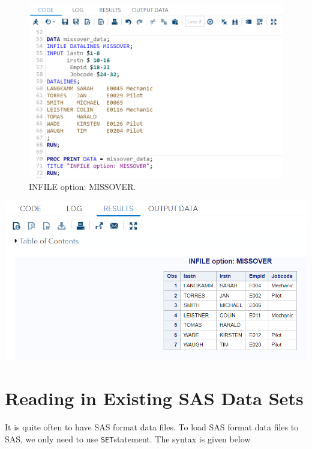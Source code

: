 \documentclass[
]{book}
\begin{document}
\begin{figure}

{\centering \includegraphics[width=1\linewidth]{img04/w04-InfileOptionMissover} 

}

\caption{INFILE option: MISSOVER.}\label{fig:unnamed-chunk-30}
\end{figure}

\begin{center}\includegraphics[width=1\linewidth]{img04/w04-missover-output} \end{center}

\hypertarget{reading-in-existing-sas-data-sets}{%
\section{Reading in Existing SAS Data Sets}\label{reading-in-existing-sas-data-sets}}

It is quite often to have SAS format data files. To load SAS format data files to SAS, we only need to use \texttt{SET}statement. The syntax is given below
\end{document}
